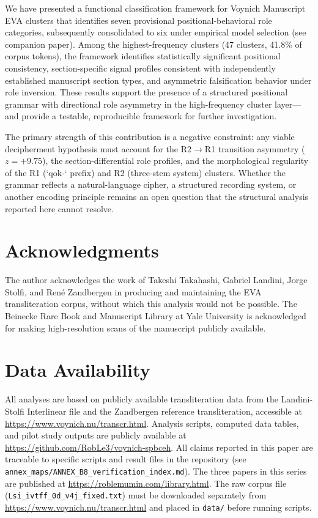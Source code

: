 \documentclass[11pt,a4paper,twocolumn]{article}
\begin{document}
We have presented a functional classification framework for Voynich Manuscript EVA clusters that identifies seven provisional positional-behavioral role categories, subsequently consolidated to six under empirical model selection (see companion paper). Among the highest-frequency clusters (47 clusters, 41.8\% of corpus tokens), the framework identifies statistically significant positional consistency, section-specific signal profiles consistent with independently established manuscript section types, and asymmetric falsification behavior under role inversion. These results support the presence of a structured positional grammar with directional role asymmetry in the high-frequency cluster layer---and provide a testable, reproducible framework for further investigation.

The primary strength of this contribution is a negative constraint: any viable decipherment hypothesis must account for the R2$\to$R1 transition asymmetry ($z = +9.75$), the section-differential role profiles, and the morphological regularity of the R1 (`qok-` prefix) and R2 (three-stem system) clusters. Whether the grammar reflects a natural-language cipher, a structured recording system, or another encoding principle remains an open question that the structural analysis reported here cannot resolve.

\section*{Acknowledgments}

The author acknowledges the work of Takeshi Takahashi, Gabriel Landini, Jorge Stolfi, and Ren\'e Zandbergen in producing and maintaining the EVA transliteration corpus, without which this analysis would not be possible. The Beinecke Rare Book and Manuscript Library at Yale University is acknowledged for making high-resolution scans of the manuscript publicly available.

\section*{Data Availability}

All analyses are based on publicly available transliteration data from the Landini-Stolfi Interlinear file and the Zandbergen reference transliteration, accessible at \url{https://www.voynich.nu/transcr.html}. Analysis scripts, computed data tables, and pilot study outputs are publicly available at \url{https://github.com/RobLe3/voynich-spbceh}. All claims reported in this paper are traceable to specific scripts and result files in the repository (see \texttt{annex\_maps/ANNEX\_B8\_verification\_index.md}). The three papers in this series are published at \url{https://roblemumin.com/library.html}. The raw corpus file (\texttt{Lsi\_ivtff\_0d\_v4j\_fixed.txt}) must be downloaded separately from \url{https://www.voynich.nu/transcr.html} and placed in \texttt{data/} before running scripts.
\end{document}
